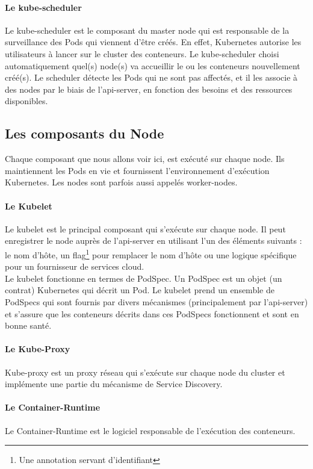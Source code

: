 \documentclass[11pt,fleqn]{book} %
\begin{document}
\paragraph*{Le kube-scheduler}
Le kube-scheduler est le composant du master node qui est responsable de la surveillance des Pods qui viennent d'être créés. En effet, Kubernetes autorise les utilisateurs à lancer sur le cluster des conteneurs. Le kube-scheduler choisi automatiquement quel(s) node(s) va accueillir le ou les conteneurs nouvellement créé(s). Le scheduler détecte les Pods qui ne sont pas affectés, et il les associe à des nodes par le biais de l'api-server, en fonction des besoins et des ressources disponibles.

\subsection*{Les composants du Node}
Chaque composant que nous allons voir ici, est exécuté sur chaque node. Ils maintiennent les Pods en vie et fournissent l'environnement d'exécution Kubernetes. Les nodes sont parfois aussi appelés worker-nodes.

\paragraph*{Le Kubelet}
Le kubelet est le principal composant qui s'exécute sur chaque node. Il peut enregistrer le node auprès de l'api-server en utilisant l'un des éléments suivants : le nom d'hôte, un flag\footnote{Une annotation servant d'identifiant} pour remplacer le nom d'hôte ou une logique spécifique pour un fournisseur de services cloud.\\

Le kubelet fonctionne en termes de PodSpec. Un PodSpec est un objet (un contrat) Kubernetes qui décrit un Pod. Le kubelet prend un ensemble de PodSpecs qui sont fournis par divers mécanismes (principalement par l'api-server) et s'assure que les conteneurs décrits dans ces PodSpecs fonctionnent et sont en bonne santé.

\paragraph*{Le Kube-Proxy}
Kube-proxy est un proxy réseau qui s’exécute sur chaque node du cluster et implémente une partie du mécanisme de Service Discovery.

\paragraph*{Le Container-Runtime}
Le Container-Runtime est le logiciel responsable de l’exécution des conteneurs.\\
\end{document}
